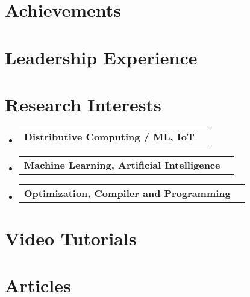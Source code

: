 \documentclass[letterpaper,11pt]{article}
\makeatletter
\newcommand{\resumeSubheadingClear}[1]{
    \vspace{-2pt}\item
    \begin{tabular*}{0.97\textwidth}[t]{l@{\extracolsep{\fill}}r}
        \textbf{#1}
    \end{tabular*}\vspace{-7pt}
}
\newcommand{\resumeSubHeadingListStart}{\begin{itemize}[leftmargin=0.15in, label={}]}
\newcommand{\resumeSubHeadingListEnd}{\end{itemize}}
\makeatother
\begin{document}
\section{Achievements}
\begin{itemize}[leftmargin=0.15in, label={}]
  \small{\item{
                
                
                
                
                
                
          }}
\end{itemize}

\section{Leadership Experience
 }
\resumeSubHeadingListStart


\resumeSubHeadingListEnd

\section{Research Interests}
\resumeSubHeadingListStart
\resumeSubheadingClear
{Distributive Computing / ML, IoT}

\resumeSubheadingClear
{Machine Learning, Artificial Intelligence}

\resumeSubheadingClear
{Optimization, Compiler and Programming}

\resumeSubHeadingListEnd

\section{Video Tutorials}
\begin{itemize}[leftmargin=0.15in, label={}]
  \small{\item{
                
                
                
          }}
\end{itemize}

\section{Articles}
\begin{itemize}[leftmargin=0.15in, label={}]
  \small{\item{
                
                
                
                
                
          }}
\end{itemize}
\end{document}
